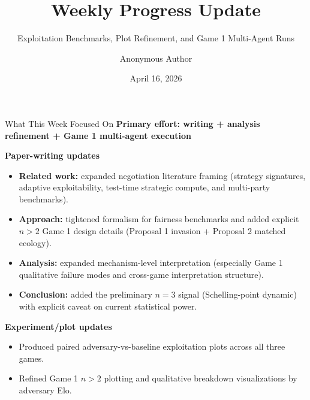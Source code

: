 \documentclass[aspectratio=169]{beamer}
\title{Weekly Progress Update}
\subtitle{Exploitation Benchmarks, Plot Refinement, and Game 1 Multi-Agent Runs}
\author{Anonymous Author}
\date{April 16, 2026}
\begin{document}
\frame{\titlepage}

\begin{frame}{What This Week Focused On}
\textbf{Primary effort: writing + analysis refinement + Game 1 multi-agent execution}

\vspace{0.3cm}
\textbf{Paper-writing updates}
\begin{itemize}
    \item \textbf{Related work:} expanded negotiation literature framing (strategy signatures, adaptive exploitability, test-time strategic compute, and multi-party benchmarks).
    \item \textbf{Approach:} tightened formalism for fairness benchmarks and added explicit $n>2$ Game 1 design details (Proposal 1 invasion + Proposal 2 matched ecology).
    \item \textbf{Analysis:} expanded mechanism-level interpretation (especially Game 1 qualitative failure modes and cross-game interpretation structure).
    \item \textbf{Conclusion:} added the preliminary $n=3$ signal (Schelling-point dynamic) with explicit caveat on current statistical power.
\end{itemize}

\textbf{Experiment/plot updates}
\begin{itemize}
    \item Produced paired adversary-vs-baseline exploitation plots across all three games.
    \item Refined Game 1 $n>2$ plotting and qualitative breakdown visualizations by adversary Elo.
\end{itemize}
\end{frame}
\end{document}
